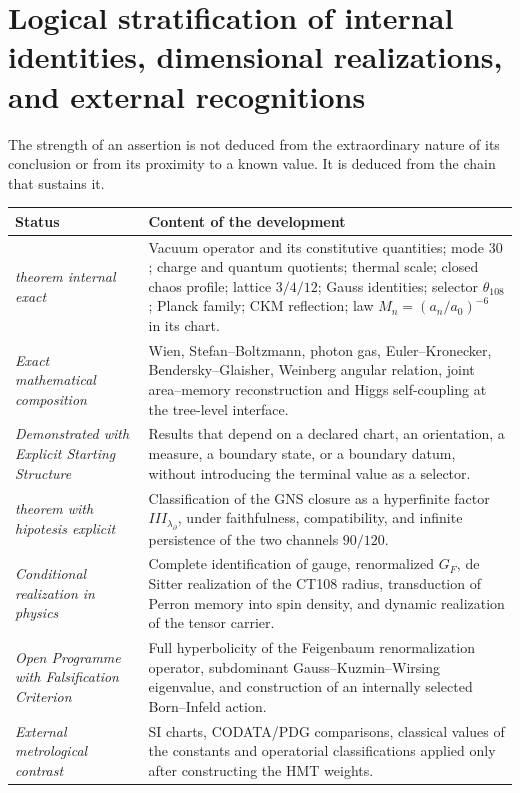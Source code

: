 \section{Logical stratification of internal identities, dimensional realizations, and external recognitions}

The strength of an assertion is not deduced from the extraordinary nature of its
conclusion or from its proximity to a known value. It is deduced from the chain
that sustains it.

\begin{longtable}{p{36mm}p{96mm}}
\toprule
Status & Content of the development\\
\midrule
\emph{theorem internal exact}
& Vacuum operator and its constitutive quantities; mode \(30\); charge and quantum
quotients; thermal scale; closed chaos profile; lattice
\(3/4/12\); Gauss identities; selector \(\theta_{108}\); Planck family; CKM reflection;
law
\(M_n=(a_n/a_0)^{-6}\) in its chart.\\

\emph{Exact mathematical composition}
& Wien, Stefan--Boltzmann, photon gas, Euler--Kronecker,
Bendersky--Glaisher, Weinberg angular relation, joint area--memory
reconstruction and Higgs self-coupling at the tree-level interface.\\

\emph{Demonstrated with Explicit Starting Structure}
& Results that depend on a declared chart, an orientation, a
measure, a boundary state, or a boundary datum, without introducing the
terminal value as a selector.\\

\emph{theorem with hipotesis explicit}
& Classification of the GNS closure as a hyperfinite factor
\(III_{\lambda_\partial}\), under faithfulness, compatibility, and infinite
persistence of the two channels \(90/120\).\\

\emph{Conditional realization in physics}
& Complete identification of gauge, renormalized \(G_F\), de Sitter realization of the
CT108 radius, transduction of Perron memory into spin density, and
dynamic realization of the tensor carrier.\\

\emph{Open Programme with Falsification Criterion}
& Full hyperbolicity of the Feigenbaum renormalization operator, subdominant
Gauss--Kuzmin--Wirsing eigenvalue, and construction of an internally selected
Born--Infeld action.\\

\emph{External metrological contrast}
& SI charts, CODATA/PDG comparisons, classical values of the constants and
operatorial classifications applied only after constructing the HMT
weights.\\
\bottomrule
\end{longtable}

